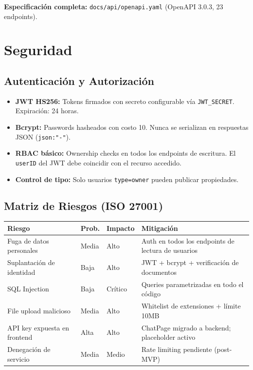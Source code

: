 \documentclass[11pt,a4paper]{article}
\begin{document}
\textbf{Especificación completa:} \texttt{docs/api/openapi.yaml} (OpenAPI 3.0.3, 23 endpoints).

\section{Seguridad}

\subsection{Autenticación y Autorización}

\begin{itemize}
    \item \textbf{JWT HS256:} Tokens firmados con secreto configurable vía \texttt{JWT\_SECRET}. Expiración: 24 horas.
    \item \textbf{Bcrypt:} Passwords hasheados con costo 10. Nunca se serializan en respuestas JSON (\texttt{json:"-"}).
    \item \textbf{RBAC básico:} Ownership checks en todos los endpoints de escritura. El \texttt{userID} del JWT debe coincidir con el recurso accedido.
    \item \textbf{Control de tipo:} Solo usuarios \texttt{type=owner} pueden publicar propiedades.
\end{itemize}

\subsection{Matriz de Riesgos (ISO 27001)}

\begin{table}[H]
    \centering
    \renewcommand{\arraystretch}{1.2}
    \begin{tabularx}{\textwidth}{>{\hsize=0.3\hsize}X >{\hsize=0.15\hsize}X >{\hsize=0.15\hsize}X >{\hsize=0.4\hsize}X}
        \toprule
        \textbf{Riesgo} & \textbf{Prob.} & \textbf{Impacto} & \textbf{Mitigación} \\
        \midrule
        Fuga de datos personales & Media & Alto & Auth en todos los endpoints de lectura de usuarios \\
        Suplantación de identidad & Baja & Alto & JWT + bcrypt + verificación de documentos \\
        SQL Injection & Baja & Crítico & Queries parametrizadas en todo el código \\
        File upload malicioso & Media & Alto & Whitelist de extensiones + límite 10MB \\
        API key expuesta en frontend & Alta & Alto & ChatPage migrado a backend; placeholder activo \\
        Denegación de servicio & Media & Medio & Rate limiting pendiente (post-MVP) \\
        \bottomrule
    \end{tabularx}
\end{table}
\end{document}

